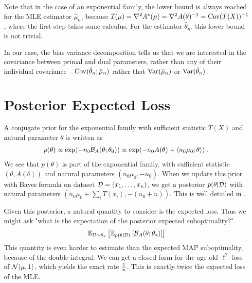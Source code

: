 \documentclass{article}
\newcommand*{\expect}[2][]{\ensuremath{\mathbb{E}_{#1} \left[ #2 \right] }} %
\newcommand{\logpart}{A}
\newcommand{\conj}{\logpart^*}
\newcommand{\bregman}{\cB_\logpart}
\newcommand{\natp}{\theta}
\newcommand{\MAPm}{\hat \mu_n}
\newcommand{\MAPt}{\hat \natp_n}
\begin{document}
Note that in the case of an exponential family, the lower bound is always reached for the MLE estimator $\hat \mu_n$, because $\cI(\mu) = \nabla^2 \conj(\mu) = \nabla^2 \logpart(\natp)^{-1} = \Cov(T(X))^{-1}$, where the first step takes some calculus. For the estimator $\hat \natp_n$, this lower bound is not trivial.

In our case, the bias variance decomposition tells us that we are interested in the covariance between primal and dual parameters, rather than any of their individual covariance -- $\Cov(\MAPt;\MAPm)$ rather that $\Var(\MAPm)$ or $\Var(\MAPt)$.

\section{Posterior Expected Loss}

A conjugate prior for the exponential family with sufficient statistic $T(X)$ and natural parameter $\natp$ is written as
\begin{align}
    p(\natp) 
    \propto \exp(-n_0 \bregman(\natp ; \natp_0)) 
    \propto \exp(-n_0 \logpart(\natp) + \langle n_0 \mu_0 ; \natp \rangle) \; .
\end{align}
We see that $p(\natp)$ is part of the exponential family, with sufficient statistic $(\natp, \logpart(\natp))$ and natural parameters $(n_0 \mu_0 , -n_0)$. When we update this prior with Bayes formula on dataset ${\mathcal D}=(x_1,\dots,x_n)$, we get a posterior $p(\natp | \cD)$ with natural parameters $(n_0 \mu_0 + \sum_i T(x_i) , -(n_0 + n))$. This is well detailed in \citet{agarwal2010geometric}. 

Given this posterior, a natural quantity to consider is the expected loss. Thus we might ask "what is the expectation of the posterior expected suboptimality?"
\begin{align}
    \expect[\cD\sim\natp_*]{\expect[p(\natp|\cD)]{\bregman(\natp ; \natp_*)}}
\end{align}
This quantity is even harder to estimate than the expected MAP suboptimality, because of the double integral. We can get a closed form for the age-old $\ell^2$ loss of ${\mathcal N}(\mu, 1)$, which yields the exact rate $\frac{1}{n}$. This is exactly twice the expected loss of the MLE.
\end{document}
